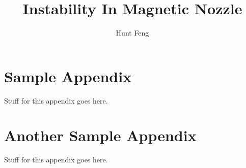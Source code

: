 \documentclass[subfigure, nofigurelist, notablelist]{uofsthesis-cs}
\title{Instability In Magnetic Nozzle}
\author{Hunt Feng}
\theoremstyle{plain}
\theoremstyle{definition}
\begin{document}
\maketitle
\tracingall

\frontmatter

%
%
%
%













%

\uofsappendix

\begin{appendices}

\chapter{Sample Appendix}

Stuff for this appendix goes here.

\chapter{Another Sample Appendix}

Stuff for this appendix goes here.

\end{appendices}
\end{document}

